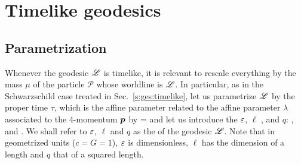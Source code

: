 \section{Timelike geodesics}

\subsection{Parametrization}

Whenever the geodesic $\mathscr{L}$ is timelike, it is relevant to
rescale everything by the mass $\mu$ of the particle $\mathscr{P}$ whose worldline is $\mathscr{L}$.
In particular, as in the Schwarzschild case treated in Sec.~\ref{s:ges:timelike},
let us parametrize $\mathscr{L}$ by the proper time $\tau$, which is the affine parameter
related to the affine parameter $\lambda$ associated to the 4-momentum $\bm{p}$
by
\be \label{e:gek:tau_mu_lamb}
    \tau = \mu \lambda
\ee
and let us introduce the
 $\varepsilon$,
$\ell$ ,
and  $q$:
\be \label{e:gek:def_eps_ell_mQ}
  , \qquad
   \qquad\mbox{and}\qquad
   .
\ee
We shall refer to $\varepsilon$, $\ell$ and $q$ as the
of the geodesic $\mathscr{L}$. Note that in geometrized units ($c=G=1$), $\varepsilon$ is
dimensionless, $\ell$ has the dimension of a length and $q$ that of a squared length.

